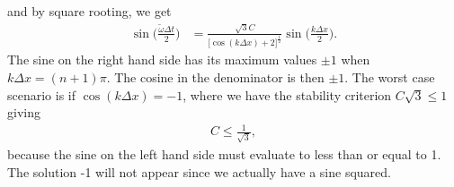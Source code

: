 \documentclass[a4paper,10pt]{article}
\renewcommand{\(}{\left(}
\renewcommand{\)}{\right)}
\begin{document}
and by square rooting, we get
\begin{align*}
  \sin\Big(\frac{\tilde\omega\Delta t}{2}\Big) &= \frac{\sqrt3C}{\Big[\cos(k\Delta x) + 2\Big]^\frac{1}{2}}\sin\Big(\frac{k\Delta x}{2}\Big).
\end{align*}
The sine on the right hand side has its maximum values $\pm 1$ when $k\Delta x=(n+1)\pi$. The cosine in the denominator is then $\pm 1$. The worst case scenario is if $\cos(k\Delta x)=-1$, where we have the stability criterion $C\sqrt 3 \leq 1$ giving
\begin{align*}
  C \leq \frac{1}{\sqrt 3},
\end{align*}
because the sine on the left hand side must evaluate to less than or equal to 1. The solution -1 will not appear since we actually have a sine squared.
\end{document}
